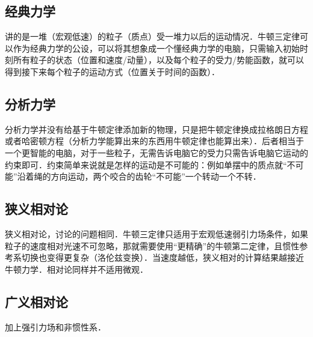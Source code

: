 
\subsection{经典力学}
讲的是一堆（宏观低速）的粒子（质点）受一堆力以后的运动情况．牛顿三定律可以作为经典力学的公设，可以将其想象成一个懂经典力学的电脑，只需输入初始时刻所有粒子的状态（位置和速度/动量），以及每个粒子的受力/势能函数，就可以得到接下来每个粒子的运动方式（位置关于时间的函数）．

\subsection{分析力学}
分析力学并没有给基于牛顿定律添加新的物理，只是把牛顿定律换成拉格朗日方程或者哈密顿方程（分析力学能算出来的东西用牛顿定律也能算出来）．后者相当于一个更智能的电脑，对于一些粒子，无需告诉电脑它的受力只需告诉电脑它运动的约束即可．约束简单来说就是怎样的运动是不可能的：例如单摆中的质点就“不可能”沿着绳的方向运动，两个咬合的齿轮“不可能”一个转动一个不转．

\subsection{狭义相对论}
狭义相对论，讨论的问题相同．牛顿三定律只适用于宏观低速弱引力场条件，如果粒子的速度相对光速不可忽略，那就需要使用“更精确”的牛顿第二定律，且惯性参考系切换也变得更复杂（洛伦兹变换）．当速度越低，狭义相对的计算结果越接近牛顿力学．相对论同样并不适用微观．

\subsection{广义相对论}
加上强引力场和非惯性系．
